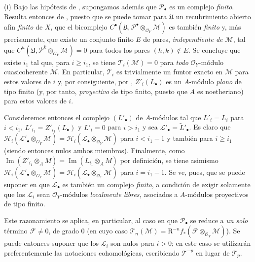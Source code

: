 \begin{remarks}[7.7.12]
\label{III.7.7.12}
\textnormal{(i)} Bajo las hipótesis de , supongamos además que
$\mathscr P_\bullet$ es un complejo \emph{finito}. Resulta entonces de
, puesto que se puede tomar para $\mathfrak U$ un
recubrimiento abierto afín \emph{finito} de $X$, que el bicomplejo
$C^\bullet(\mathfrak U,\mathscr P^\bullet\otimes_{\mathscr O_Y}\mathscr M)$ es también \emph{finito} y, más
precisamente, que existe un conjunto finito $E$ de pares, \emph{independiente
de $\mathscr M$}, tal que
$C^h(\mathfrak U,\mathscr P^k\otimes_{\mathscr O_Y}\mathscr M)=0$ para todos los pares $(h,k)\notin E$.
Se concluye que existe $i_1$ tal que, para $i\geq i_1$, se tiene
$\mathscr T_i(\mathscr M)=0$ para \emph{todo} $\mathscr O_Y$-módulo
cuasicoherente $\mathscr M$. En particular, $\mathscr T_i$ es trivialmente un
funtor exacto en $\mathscr M$ para estos valores de $i$ y, por consiguiente,
por , $Z'_i(L_\bullet)$ es un $A$-módulo \emph{plano} de tipo
finito (y, por tanto, \emph{proyectivo} de tipo finito, puesto que $A$ es
noetheriano) para estos valores de $i$.

Consideremos entonces el complejo $(L'_\bullet)$ de $A$-módulos tal que
$L'_i=L_i$ para $i<i_1$, $L'_{i_1}=Z'_{i_1}(L_\bullet)$ y $L'_i=0$ para
$i>i_1$ y sea $\mathscr L'_\bullet=\widetilde{L}'_\bullet$. Es claro que
$  \mathscr H_i(\mathscr L'_\bullet\otimes_{\mathscr O_Y}\mathscr M)
  =
  \mathscr H_i(\mathscr L_\bullet\otimes_{\mathscr O_Y}\mathscr M)$
para $i<i_1-1$ y también para $i\geq i_1$ (siendo entonces nulos ambos
miembros). Finalmente, como
$\operatorname{Im}(Z'_{i_1}\otimes_A M)=\operatorname{Im}(L_{i_1}\otimes_A M)$
por definición, se tiene asimismo
$\mathscr H_i(\mathscr L'_\bullet\otimes_{\mathscr O_Y}\mathscr M)
=\mathscr H_i(\mathscr L_\bullet\otimes_{\mathscr O_Y}\mathscr M)$
para $i=i_1-1$. Se ve, pues, que se puede suponer en  que
$\mathscr L_\bullet$ es también un complejo \emph{finito}, a condición de
exigir solamente que los $\mathscr L_i$ sean $\mathscr O_Y$-módulos
\emph{localmente libres}, asociados a $A$-módulos proyectivos de tipo finito.

Este razonamiento se aplica, en particular, al caso en que
$\mathscr P_\bullet$ se reduce a \emph{un solo} término $\mathscr F\ne0$, de grado 0 (en cuyo caso
$\mathscr T_n(\mathscr M)=\mathrm R^{-n}f_*
(\mathscr F\otimes_{\mathscr O_Y}\mathscr M)$). Se puede entonces suponer que
los $\mathscr L_i$ son nulos para $i>0$; en este caso se utilizarán
preferentemente las notaciones cohomológicas, escribiendo $\mathscr T^{-p}$ en
lugar de $\mathscr T_p$.


\end{remarks}
